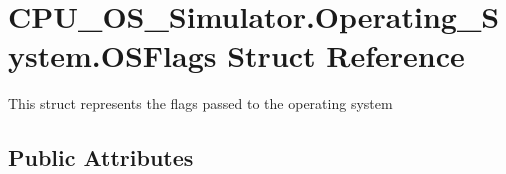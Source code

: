 \hypertarget{struct_c_p_u___o_s___simulator_1_1_operating___system_1_1_o_s_flags}{}\section{C\+P\+U\+\_\+\+O\+S\+\_\+\+Simulator.\+Operating\+\_\+\+System.\+O\+S\+Flags Struct Reference}
\label{struct_c_p_u___o_s___simulator_1_1_operating___system_1_1_o_s_flags}


This struct represents the flags passed to the operating system  


\subsection*{Public Attributes}
